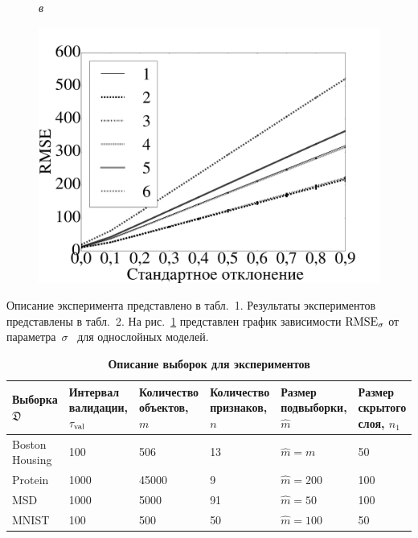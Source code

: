 \begin{figure}[tbh!]
\endminipage\hfill
{}%
\caption*{\textit{в}}
\includegraphics[width=1.0\textwidth]{./plots/var/msd/rmse_data2.pdf}

\endminipage
\caption{}
\label{fig:noise_in_data}
\end{figure}



Описание эксперимента представлено в табл.~1. Результаты экспериментов представлены в табл.~2. На рис.~\ref{fig:noise_in_data} представлен график зависимости $\textnormal{RMSE}_{\sigma}$ от параметра~$\sigma$~{ для однослойных моделей}. 

\begin{table}[!htbp]
\captionsetup{justification=raggedright,singlelinecheck=false}
\label{table1}
\caption{\textbf{Описание выборок для экспериментов}}
\footnotesize
\centering

\begin{tabular}{ | p{2cm} |p{2cm} | p{2cm} | p{2cm} | p{2cm} | p{2cm} | }
\hline
Выборка $\mathfrak{D}$ & Интервал валидации, $\tau_\textnormal{val}$ & Количество объектов, $m$ & Количество признаков, $n$ & Размер подвыборки, $\hat{m}$ &  Размер скрытого слоя, $n_1$ \\
\hline
Boston Housing & 100 & 506 & 13 & $\hat{m} = m$ & 50 \\
\hline
Protein & 1000 & 45000 & 9 & $\hat{m} = 200$ & 100 \\
\hline
MSD & 1000& 5000 & 91 & $\hat{m} = 50$ & 100\\
\hline
MNIST & 100  & 500 & 50 & $\hat{m} = 100$ & 50\\ 
\hline
\end{tabular}
\end{table}


